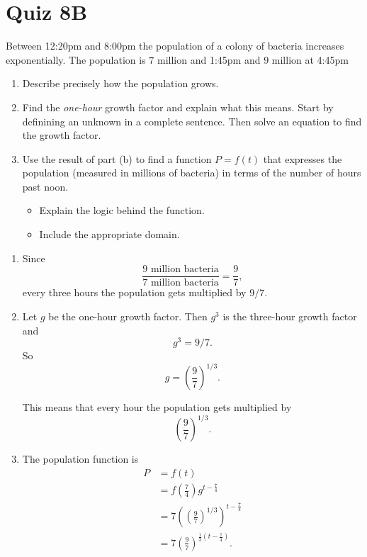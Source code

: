 \documentclass{ximera}
\begin{document}
\section{Quiz 8B}
\begin{question} \label{Q9vef0m}
Between 12:20pm and 8:00pm the population of a colony of bacteria increases exponentially. The population is $7$ million and 1:45pm and $9$ million at 4:45pm

\begin{enumerate}
\item Describe precisely how the population grows.

\item Find the \emph{one-hour} growth factor and explain what this means. Start by definining an unknown in a complete sentence. Then solve an equation to find the growth factor.

\item Use the result of part (b) to find a function $P=f(t)$ that expresses the population (measured in millions of bacteria) in terms of the number of hours past noon. 

\begin{itemize}
\item Explain the logic behind the function.

\item Include the appropriate domain.
\end{itemize}
\end{enumerate}

\begin{explanation}
\begin{enumerate}
\item Since
\[
 \frac{9 \text{ million bacteria}}{7 \text{ million bacteria}} = \frac{9}{7} ,
\]
every three hours the population gets multiplied by $9/7$.

\item Let $g$ be the one-hour growth factor. Then $g^3$ is the three-hour growth factor and
\[
  g^3 = 9/7.
\]
So
\[
  g = \left( \frac{9}{7} \right)^{1/3}.
\]

This means that every hour the population gets multiplied by
\[
  \left( \frac{9}{7} \right)^{1/3}.
\]

\item The population function is
\begin{align*}
     P &= f(t)  \\
        &= f \left(\frac{7}{4}\right) g^{t - \frac{7}{4}} \\
        &= 7 \left( \left( \frac{9}{7} \right)^{1/3} \right)^{t - \frac{7}{4}} \\
         &= 7 \left( \frac{9}{7} \right)^{\frac{1}{3}\left(t - \frac{7}{4}\right)}.
\end{align*}


\end{enumerate}
\end{explanation}
\end{question}
\end{document}

